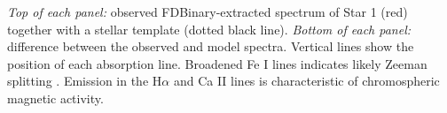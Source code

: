 \label{fig:emission1} \emph{Top of each panel:} observed FDBinary-extracted spectrum of Star 1 (red) together with a stellar template (dotted black line). \emph{Bottom of each panel:} difference between the observed and model spectra. Vertical lines show the position of each absorption line. Broadened Fe I lines indicates likely Zeeman splitting \citep{har73}. Emission in the H$\alpha$ and Ca II lines is characteristic of chromospheric magnetic activity.
  
  
  
  
  
  
  